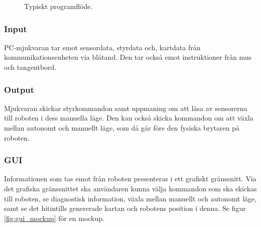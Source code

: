 \documentclass[a4paper,11pt]{article}
\begin{document}
\begin{figure}[h!]
\caption{Typiskt programflöde.}
\label{fig:gui_flowchart}
\end{figure}


\subsubsection{Input}
PC-mjukvaran tar emot sensordata, styrdata och, kartdata från kommunikationsenheten via blåtand. Den tar också emot instruktioner från mus och tangentbord. 

\subsubsection{Output}
Mjukvaran skickar styrkommandon samt uppmaning om att läsa av sensorerna till roboten i dess manuella läge. Den kan också skicka kommandon om att växla mellan autonomt och manuellt läge, som då går före den fysiska brytaren på roboten.

\subsubsection{GUI}
Informationen som tas emot från roboten presenteras i ett grafiskt gränssnitt. Via det grafiska gränssnittet ska användaren kunna välja kommandon som ska skickas till roboten, se diagnostisk information, växla mellan manuellt och autonomt läge, samt se det hitintills genererade kartan och robotens position i denna. Se figur \ref{fig:gui_mockup} för en mockup.
\end{document}
